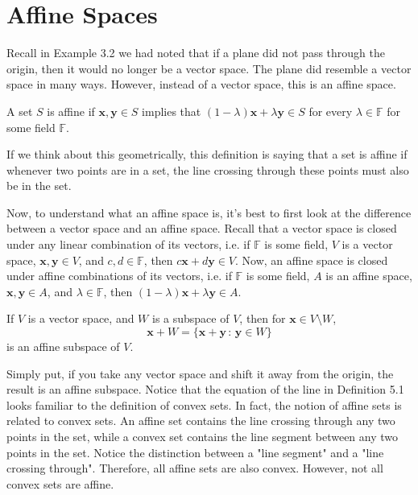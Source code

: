 \documentclass[12pt]{article}
\begin{document}
\section{Affine Spaces}
Recall in Example 3.2 we had noted that if a plane did not pass through the origin, then it would no longer be a vector space. The plane did resemble a vector space in many ways. However, instead of a vector space, this is an affine space. 
\begin{definition}
A set $S$ is affine if $\mathbf{x},\mathbf{y}\in S$ implies that $(1-\lambda)\mathbf{x} + \lambda\mathbf{y}\in S$ for every $\lambda\in \mathbb{F}$ for some field $\mathbb{F}$.
\end{definition}
\noindent If we think about this geometrically, this definition is saying that a set is affine if whenever two points are in a set, the line crossing through these points must also be in the set. 

\noindent Now, to understand what an affine space is, it's best to first look at the difference between a vector space and an affine space. Recall that a vector space is closed under any linear combination of its vectors, i.e. if $\mathbb{F}$ is some field, $V$ is a vector space, $\mathbf{x},\mathbf{y}\in V$, and $c, d\in\mathbb{F}$, then $c\mathbf{x} + d\mathbf{y}\in V$. Now, an affine space is closed under affine combinations of its vectors, i.e. if $\mathbb{F}$ is some field, $A$ is an affine space, $\mathbf{x},\mathbf{y}\in A$, and $\lambda\in \mathbb{F}$, then $(1-\lambda)\mathbf{x} + \lambda\mathbf{y}\in A$.

\begin{definition}
If $V$ is a vector space, and $W$ is a subspace of $V$, then for $\mathbf{x}\in V\setminus W$, $$\mathbf{x} + W = \{\mathbf{x} + \mathbf{y}\,:\,\mathbf{y}\in W\}$$ is an affine subspace of $V$.
\end{definition}
\noindent Simply put, if you take any vector space and shift it away from the origin, the result is an affine subspace. Notice that the equation of the line in Definition 5.1 looks familiar to the definition of convex sets. In fact, the notion of affine sets is related to convex sets. An affine set contains the line crossing through any two points in the set, while a convex set contains the line segment between any two points in the set. Notice the distinction between a "line segment" and a "line crossing through". Therefore, all affine sets are also convex. However, not all convex sets are affine.
\end{document}
